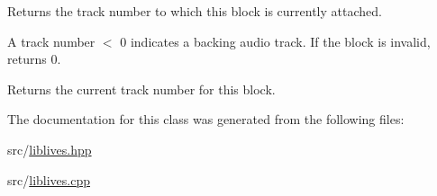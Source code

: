 Returns the track number to which this block is currently attached. 

A track number $<$ 0 indicates a backing audio track. If the block is invalid, returns 0. \begin{DoxyReturn}{Returns}
the current track number for this block. 
\end{DoxyReturn}


The documentation for this class was generated from the following files\-:\begin{DoxyCompactItemize}
\item 
src/\hyperlink{liblives_8hpp}{liblives.\-hpp}\item 
src/\hyperlink{liblives_8cpp}{liblives.\-cpp}\end{DoxyCompactItemize}
